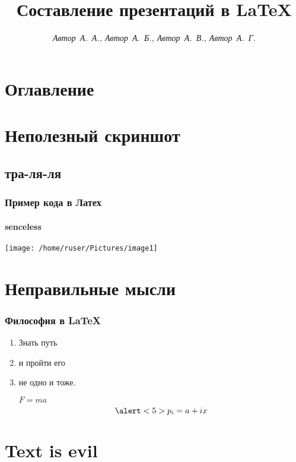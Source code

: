 \documentclass[brown]{beamer}
\title{\bf Составление презентаций в \LaTeX}
\author{\it Автор~А.~А., Автор~А.~Б., Автор~А.~В., Автор~А.~Г.}
\begin{document}
\begin{frame}
\titlepage
\end{frame}

\section*{Оглавление}
\begin{frame}
\tableofcontents
\end{frame}

\section{Неполезный скриншот}
\subsection{тра-ля-ля}

\begin{frame}
\frametitle{Пример кода в Латех}
\framesubtitle{senceless}

\center
\texttt{[image: /home/ruser/Pictures/image1]}
\end{frame}

\section{Неправильные мысли}

\begin{frame}
\frametitle{Философия в \LaTeX}

\begin{enumerate}
\item<1-5> \alert<3>{ Знать } путь

\item<2> и \alert<4>{пройти} его

\item<1,5> не одно и тоже. 

$F = ma$\\

\begin{equation}
\alert<5>{p_i} = a + ix
\end{equation}

\end{enumerate}

\end{frame}

\section{Text is evil}
\end{document}
